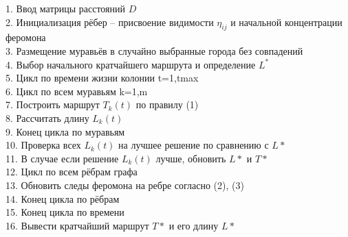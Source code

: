 \documentclass[a4paper,12pt]{article}
\begin{document}
\begin{flushleft}
	1. Ввод матрицы расстояний $D$\\
		2. Инициализация рёбер -- присвоение видимости $\eta_{ij}$ и начальной концентрации
		феромона\\
		3. Размещение муравьёв в случайно выбранные города без совпадений\\
		4. Выбор начального кратчайшего маршрута и определение $L^{*}$\\
		5. Цикл по времени жизни колонии t=1,tmax\\
		6. \hspace{1.5cm} Цикл по всем муравьям k=1,m\\
		7. \hspace{3cm}Построить маршрут $T_{k}(t)$ по правилу (1)\\
		8. \hspace{3cm}Рассчитать длину $L_{k}(t)$\\
		9. \hspace{1.5cm}Конец цикла по муравьям\\
		10. \hspace{1.5cm}Проверка всех $L_{k}(t)$ на лучшее решение по сравнению с $L*$\\
		11. \hspace{3cm}В случае если решение $L_{k}(t)$ лучше, обновить $L*$ и $T*$\\
		12. \hspace{1.5cm}Цикл по всем рёбрам графа\\
		13. \hspace{3cm}Обновить следы феромона на ребре согласно (2), (3)\\
		14. \hspace{1.5cm}Конец цикла по рёбрам\\
		15. Конец цикла по времени\\
		16. Вывести кратчайший маршрут $T*$ и его длину $L*$\\
\end{flushleft}


\pagebreak

\end{document}
